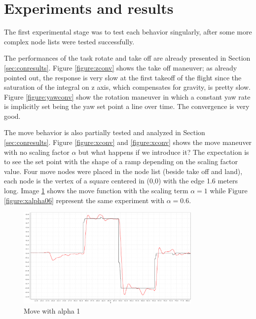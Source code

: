 \section{Experiments and results}

The first experimental stage was to test each behavior singularly, after some more complex node lists were tested successfully. 

The performances of the task rotate and take off are already presented in Section \ref{sec:conresults}. Figure \ref{figure:zconv} shows the take off maneuver; as already pointed out, the response is very slow at the first takeoff of the flight since the saturation of the integral on z axis, which compensates for gravity, is pretty slow. Figure \ref{figure:yawconv} show the rotation maneuver in which a constant yaw rate is implicitly set being the yaw set point a line over time. The convergence is very good. 

The move behavior is also partially tested and analyzed in Section \ref{sec:conresults}. Figure \ref{figure:xconv} and \ref{figure:xconv} shows the move maneuver with no scaling factor $\alpha$ but what happens if we introduce it? The expectation is to see the set point with the shape of a ramp depending on the scaling factor value. Four move nodes were placed in the node list (beside take off and land), each node is the vertex of a square centered in (0,0) with the edge 1.6 meters long. Image \ref{figure:xalpha1} shows the move function with the scaling term $\alpha = 1$ while Figure \ref{figure:xalpha06} represent the same experiment with $\alpha = 0.6$. 
\begin{figure}[h]
\centering
 \includegraphics[width=0.8\textwidth]{xalpha1.png}
 \caption{Move with alpha 1}
 \label{figure:xalpha1}
\end{figure}

